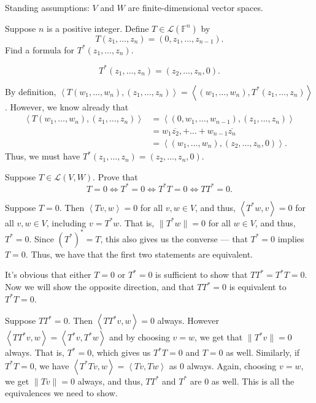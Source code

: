 \documentclass[12 pt, letterpaper]{hmcpset}
\begin{document}
Standing assumptions: $V$ and $W$ are finite-dimensional vector spaces.

\begin{problem}[1]
	Suppose $n$ is a positive integer. Define $T \in \mathcal{L}(\mathbb{F}^{n})$ by
	\[
		T(z_{1}, \dots, z_{n}) = (0, z_{1}, \dots, z_{n - 1}).
	\]
	Find a formula for $T^{*}(z_{1}, \dots, z_{n})$.
\end{problem}

\begin{solution}
	\[
		\boxed{
			T^{*}(z_{1}, \dots, z_{n}) = (z_{2}, \dots, z_{n}, 0).
		}
	\]

	By definition, $\left < T(w_{1}, \dots, w_{n}), (z_{1}, \dots, z_{n}) \right > = \left < (w_{1}, \dots, w_{n}), T^{*}(z_{1}, \dots, z_{n}) \right >$. However, we know already that
	\[
		\begin{split}
			\left < T(w_{1}, \dots, w_{n}), (z_{1}, \dots, z_{n}) \right > & = \left < (0, w_{1}, \dots, w_{n - 1}), (z_{1}, \dots, z_{n}) \right > \\
										       & = w_{1} \overline{z_{2}}, + \dots + w_{n - 1} \overline{z_{n}} \\
										       & = \left < (w_{1}, \dots, w_{n}), (z_{2}, \dots, z_{n}, 0) \right >.
		\end{split}
	\]
	Thus, we must have $T^{*}(z_{1}, \dots, z_{n}) = (z_{2}, \dots, z_{n}, 0)$.
\end{solution}

\pagebreak

\begin{problem}[2]
	Suppose $T \in \mathcal{L}(V, W)$. Prove that
	\[
		T = 0 \iff T^{*} = 0 \iff T^{*}T = 0 \iff T T^{*} = 0.
	\]
\end{problem}

\begin{solution}
	Suppose $T = 0$. Then $\left < Tv, w \right > = 0$ for all $v, w \in V$, and thus, $\left < T^{*} w, v \right > = 0$ for all $v, w \in V$, including $v = T^{*} w$. That is, $\lVert T^{*} w \rVert = 0$ for all $w \in V$, and thus, $T^{*} = 0$. Since $(T^{*})^{*} = T$, this also gives us the converse --- that $T^{*} = 0$ implies $T = 0$. Thus, we have that the first two statements are equivalent.

	It's obvious that either $T = 0$ or $T^{*} = 0$ is sufficient to show that $T T^{*} = T^{*} T = 0$. Now we will show the opposite direction, and that $T T^{*} = 0$ is equivalent to $T^{*} T = 0$.

	Suppose $T T^{*} = 0$. Then $\left < T T^{*} v, w \right > = 0$ always. However $\left < T T^{*} v, w \right > = \left < T^{*} v, T^{*} w \right >$ and by choosing $v = w$, we get that $\lVert T^{*} v \rVert = 0$ always. That is, $T^{*} = 0$, which gives us $T^{*} T = 0$ and $T = 0$ as well. Similarly, if  $T^{*} T = 0$, we have $\left < T^{*} T v, w \right > = \left < Tv, Tw \right >$ as $0$ always. Again, choosing $v = w$, we get $\lVert T v \rVert = 0$ always, and thus, $T T^{*}$ and $T^{*}$ are $0$ as well. This is all the equivalences we need to show. 
\end{solution}
\end{document}
